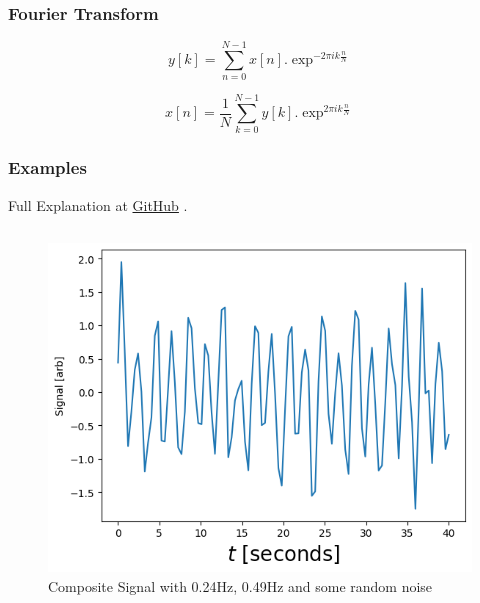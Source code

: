 \documentclass{beamer}
\newcommand{\github}{
\href{https://github.com/A-M-Kharazi/Machine-Learning-TMU}{GitHub}
}
\begin{document}
	\begin{frame}
		\frametitle{Fourier Transform}
		
		\begin{equation}\label{eq1}
			y[k] = \sum\limits_{n=0}^{N-1} x[n].\exp^{-2\pi i k \frac{n}{N}}
		\end{equation}
		
		\begin{equation}\label{eq2}
			x[n] = \frac{1}{N}\sum\limits_{k=0}^{N-1}y[k].\exp^{2\pi i k \frac{n}{N}}
		\end{equation}
		
	\end{frame}



	\begin{frame}
		\frametitle{Examples}
		
		Full Explanation at \github.
		
		\begin{columns}
			\begin{column}{0.4\textwidth}
				\begin{figure}\label{fig2}
					\begin{center}
						\includegraphics[scale=0.3]{fig1.png}
					\end{center}
				\caption{Composite Signal with 0.24Hz, 0.49Hz and some random noise }
				\end{figure}
			\end{column}
		

\end{columns}
\end{frame}
\end{document}
